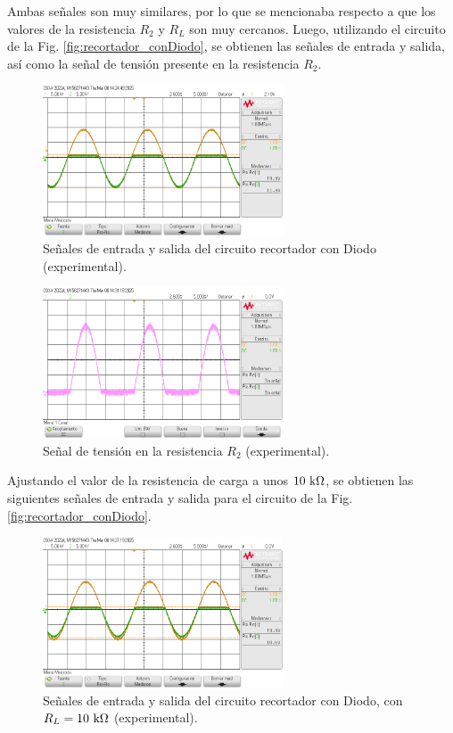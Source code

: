 \documentclass[journal]{IEEEtran}
\begin{document}
Ambas señales son muy similares, por lo que se mencionaba respecto a que los valores de la resistencia $R_2$ y $R_L$ son muy cercanos. Luego,
utilizando el circuito de la Fig. \ref{fig:recortador_conDiodo}, se obtienen las señales de entrada y salida, así como la señal de tensión presente en la resistencia $R_2$.

\begin{figure}[H]
        \centering
        \includegraphics[width=2.8in]{SignalExperimental_03.png}
        \caption{Señales de entrada y salida del circuito recortador con Diodo (experimental).}
        \label{fig:SignalExperimental_03}
\end{figure}

\begin{figure}[H]
        \centering
        \includegraphics[width=2.8in]{SignalExperimental_04.png}
        \caption{Señal de tensión en la resistencia $R_2$ (experimental).}
        \label{fig:SignalExperimental_04}
\end{figure}

Ajustando el valor de la resistencia de carga a unos $10~\textnormal{k}\Omega$, se obtienen las siguientes señales de entrada y salida para el circuito de la Fig. \ref{fig:recortador_conDiodo}.
\begin{figure}[H]
        \centering
        \includegraphics[width=2.8in]{SignalExperimental_05.png}
        \caption{Señales de entrada y salida del circuito recortador con Diodo, con $R_L=10~\textnormal{k}\Omega$ (experimental).}
        \label{fig:SignalExperimental_05}
\end{figure}
\end{document}
